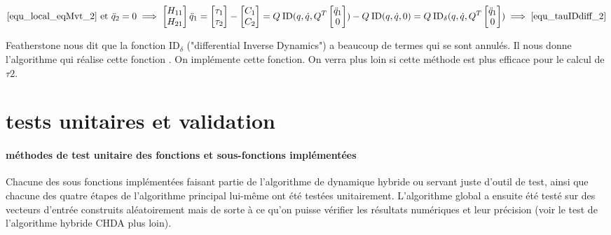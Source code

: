 \documentclass{report}
\begin{document}
\begin{align*}
\ref{equ_local_eqMvt_2} \textnormal{ et } \ddot{q}_2 = 0 \implies 
\begin{bmatrix}
  H_{11} \\
  H_{21}
\end{bmatrix} \ddot{q}_1
=
\begin{bmatrix}
  \tau_1 \\
  \tau_2
\end{bmatrix}
-
\begin{bmatrix}
  C_1 \\
  C_2
\end{bmatrix}
=
Q \: \mathrm{ID}(q,\dot{q},Q^T\begin{bmatrix}
                                \ddot{q}_1 \\      
                                0         
                              \end{bmatrix}) - Q \: \mathrm{ID}(q,\dot{q},0) 
=
Q \: \mathrm{ID}_{\delta}(q,\dot{q},Q^T\begin{bmatrix}
                                         \ddot{q}_1 \\      
                                         0         
                                       \end{bmatrix}) \implies \ref{equ_tauIDdiff_2}
\end{align*} 

Featherstone nous dit \cite[p103]{bib_featherstone} que la fonction $\mathrm{ID}_{\delta}$ ("differential Inverse Dynamics") a beaucoup de termes qui se sont annulés. Il nous donne l'algorithme qui réalise cette fonction \cite[p104]{bib_featherstone}. On implémente cette fonction. On verra plus loin si cette méthode est plus efficace pour le calcul de $\tau2$.


\section{tests unitaires et validation}

\paragraph{méthodes de test unitaire des fonctions et sous-fonctions implémentées}

Chacune des sous fonctions implémentées faisant partie de l'algorithme de dynamique hybride ou servant juste d'outil de test, ainsi que chacune des quatre étapes de l'algorithme principal lui-même ont été testées unitairement. L'algorithme global a ensuite été testé sur des vecteurs d'entrée construits aléatoirement mais de sorte à ce qu'on puisse vérifier les résultats numériques et leur précision (voir le test de l'algorithme hybride CHDA plus loin).
\end{document}
